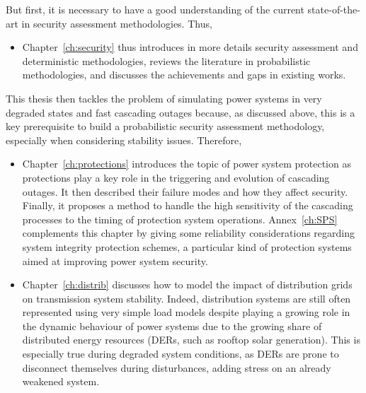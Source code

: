 But first, it is necessary to have a good understanding of the current state-of-the-art in security assessment methodologies. Thus,

\begin{itemize}
    \item Chapter~\ref{ch:security} thus introduces in more details security assessment and deterministic methodologies, reviews the literature in probabilistic methodologies, and discusses the achievements and gaps in existing works.
\end{itemize}

This thesis then tackles the problem of simulating power systems in very degraded states and fast cascading outages because, as discussed above, this is a key prerequisite to build a probabilistic security assessment methodology, especially when considering stability issues. Therefore,

\begin{itemize}
    \item Chapter~\ref{ch:protections} introduces the topic of power system protection as protections play a key role in the triggering and evolution of cascading outages. It then described their failure modes and how they affect security. Finally, it proposes a method to handle the high sensitivity of the cascading processes to the timing of protection system operations. Annex~\ref{ch:SPS} complements this chapter by giving some reliability considerations regarding system integrity protection schemes, a particular kind of protection systems aimed at improving power system security.
    \item Chapter~\ref{ch:distrib} discusses how to model the impact of distribution grids on transmission system stability. Indeed, distribution systems are still often represented using very simple load models despite playing a growing role in the dynamic behaviour of power systems due to the growing share of distributed energy resources (DERs, such as rooftop solar generation). This is especially true during degraded system conditions, as DERs are prone to disconnect themselves during disturbances, adding stress on an already weakened system.
\end{itemize}

